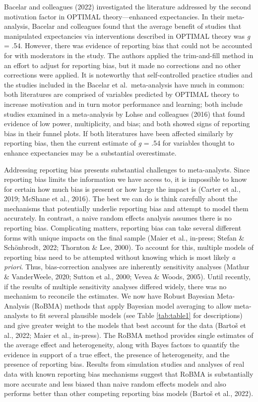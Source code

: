 \documentclass[
  doc, donotrepeattitle,floatsintext]{apa7}
\begin{document}
Bacelar and colleagues (2022) investigated the literature addressed by the second motivation factor in OPTIMAL theory---enhanced expectancies. In their meta-analysis, Bacelar and colleagues found that the average benefit of studies that manipulated expectancies via interventions described in OPTIMAL theory was \emph{g} = .54. However, there was evidence of reporting bias that could not be accounted for with moderators in the study. The authors applied the trim-and-fill method in an effort to adjust for reporting bias, but it made no corrections and no other corrections were applied. It is noteworthy that self-controlled practice studies and the studies included in the Bacelar et al.~meta-analysis have much in common: both literatures are comprised of variables predicted by OPTIMAL theory to increase motivation and in turn motor performance and learning; both include studies examined in a meta-analysis by Lohse and colleagues (2016) that found evidence of low power, multiplicity, and bias; and both showed signs of reporting bias in their funnel plots. If both literatures have been affected similarly by reporting bias, then the current estimate of \emph{g} = .54 for variables thought to enhance expectancies may be a substantial overestimate.

Addressing reporting bias presents substantial challenges to meta-analysts. Since reporting bias limits the information we have access to, it is impossible to know for certain how much bias is present or how large the impact is (Carter et al., 2019; McShane et al., 2016). The best we can do is think carefully about the mechanisms that potentially underlie reporting bias and attempt to model them accurately. In contrast, a naive random effects analysis assumes there is no reporting bias. Complicating matters, reporting bias can take several different forms with unique impacts on the final sample (Maier et al., in-press; Stefan \& Schönbrodt, 2022; Thornton \& Lee, 2000). To account for this, multiple models of reporting bias need to be attempted without knowing which is most likely \emph{a priori}. Thus, bias-correction analyses are inherently sensitivity analyses (Mathur \& VanderWeele, 2020; Sutton et al., 2000; Vevea \& Woods, 2005). Until recently, if the results of multiple sensitivity analyses differed widely, there was no mechanism to reconcile the estimates. We now have Robust Bayesian Meta-Analysis (RoBMA) methods that apply Bayesian model averaging to allow meta-analysts to fit several plausible models (see Table \ref{tab:table1} for descriptions) and give greater weight to the models that best account for the data (Bartoš et al., 2022; Maier et al., in-press). The RoBMA method provides single estimates of the average effect and heterogeneity, along with Bayes factors to quantify the evidence in support of a true effect, the presence of heterogeneity, and the presence of reporting bias. Results from simulation studies and analyses of real data with known reporting bias mechanisms suggest that RoBMA is substantially more accurate and less biased than naive random effects models and also performs better than other competing reporting bias models (Bartoš et al., 2022).
\end{document}
